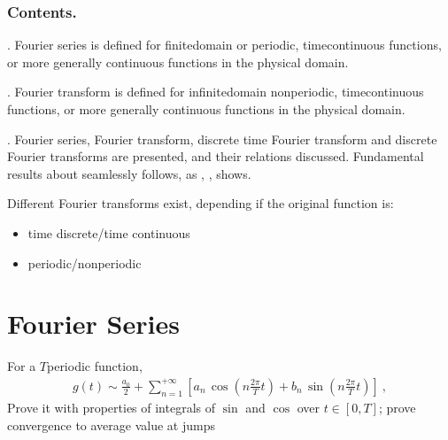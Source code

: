 \documentclass[letterpaper,10pt,english]{jupyterBook}
\begin{document}
\subsubsection*{Contents.}

\sphinxAtStartPar
{\hyperref[\detokenize{ch/complex/fourier-series:complex-fourier-series}]{}}. Fourier series is defined for finite\sphinxhyphen{}domain or periodic, time\sphinxhyphen{}continuous functions, or \sphinxhyphen{} more generally \sphinxhyphen{} continuous functions in the physical domain.

\sphinxAtStartPar
{\hyperref[\detokenize{ch/complex/fourier-transform:complex-fourier-transform}]{}}. Fourier transform is defined for infinite\sphinxhyphen{}domain non\sphinxhyphen{}periodic, time\sphinxhyphen{}continuous functions, or \sphinxhyphen{} more generally \sphinxhyphen{} continuous functions in the physical domain.

\sphinxAtStartPar
{\hyperref[\detokenize{ch/complex/fourier-transforms:complex-fourier-transforms}]{}}. Fourier series, Fourier transform, discrete time Fourier transform and discrete Fourier transforms are presented, and their relations discussed. Fundamental results about  seamlessly follows, as , {\hyperref[\detokenize{ch/complex/fourier-transforms:thm-shannon-nyquist}]{}}, shows.

\sphinxAtStartPar
Different Fourier transforms exist, depending if the original function is:
\begin{itemize}
\item {} 
\sphinxAtStartPar
time discrete/time continuous

\item {} 
\sphinxAtStartPar
periodic/non\sphinxhyphen{}periodic

\end{itemize}

\sphinxstepscope


\section{Fourier Series}
\label{\detokenize{ch/complex/fourier-series:fourier-series}}\label{\detokenize{ch/complex/fourier-series:complex-fourier-series}}\label{\detokenize{ch/complex/fourier-series::doc}}
\sphinxAtStartPar
For a \(T\)\sphinxhyphen{}periodic function,
\begin{equation*}
\begin{split}g(t) \sim \frac{a_0}{2} + \sum_{n=1}^{+\infty} \left[ a_n \, \cos\left( n \frac{2\pi}{T} t \right) + b_n \, \sin\left( n \frac{2 \pi }{T} t \right) \right] \ ,\end{split}
\end{equation*}
\sphinxAtStartPar
{} Prove it with properties of integrals of \(\sin\) and \(\cos\) over \(t \in \left[ 0, T \right]\); prove convergence to average value at jumps
\end{document}
